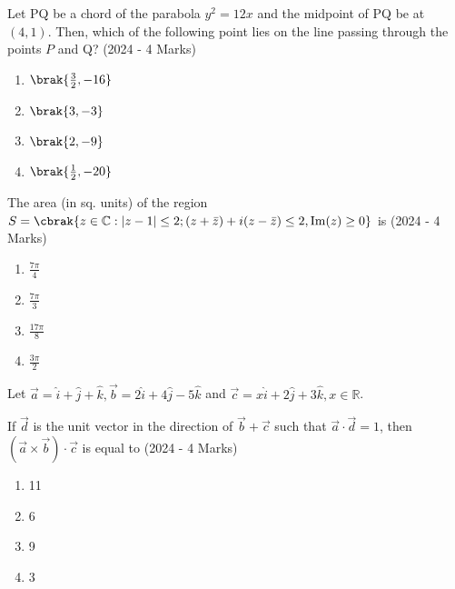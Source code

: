     \item{
    		
    		Let PQ be a chord of the parabola $y^{2}=12 x$ and the midpoint of PQ be at $(4,1)$. Then, which of the following point lies on the line passing through the points $P$ and Q?
             \hfill
                {(2024 - 4 Marks)}
			\begin{multicols}{4}
				\begin{enumerate}
					\item $\brak{\frac{3}{2},-16}$
					\item $\brak{3,-3}$
					\item $\brak{2,-9}$
					\item $\brak{\frac{1}{2},-20}$
				\end{enumerate}
			\end{multicols}
        
        }
    \item{
        	
        	The area (in sq. units) of the region $S=\cbrak{z \in \mathbb{C}:|z-1| \leq 2 ;(z+\bar{z})+i(z-\bar{z}) \leq 2, \operatorname{Im}(z) \geq 0}$ is\hfill
                {(2024 - 4 Marks)}
				\begin{multicols}{4}
	                \begin{enumerate}
	                	\item $\frac{7 \pi}{4}$
	                	\item $\frac{7 \pi}{3}$
	                	\item $\frac{17 \pi}{8}$
	                	\item $\frac{3 \pi}{2}$
	                \end{enumerate}
				\end{multicols}
        
        }
 \item{
    	
	    	Let $\vec{a}=\hat{i}+\hat{j}+\hat{k}, \vec{b}=2 \hat{i}+4 \hat{j}-5 \hat{k}$ and $\vec{c}=x \hat{i}+2 \hat{j}+3 \hat{k}, x \in \mathbb{R}$.
	    	
	    	If $\vec{d}$ is the unit vector in the direction of $\vec{b}+\vec{c}$ such that $\vec{a} \cdot \vec{d}=1$, then $(\vec{a} \times \vec{b}) \cdot \vec{c}$ is equal to
	    	\text{   }\hfill
	    	{(2024 - 4 Marks)}
	    	\begin{multicols}{4}
	    		\begin{enumerate}
	    			\item 11
	    			\item 6
	    			\item 9
	    			\item 3
	    		\end{enumerate}
	    	\end{multicols}
	    	
	    }
